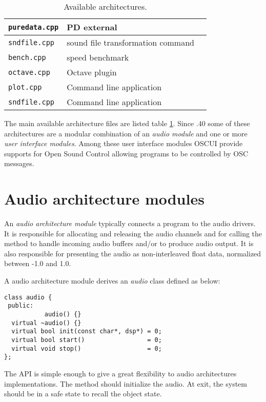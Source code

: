 \begin{table}[htp]
\begin{center}
\begin{tabular}{|l|l|l|}
\texttt{puredata.cpp} 		& PD external  \\
\hline
\texttt{sndfile.cpp} 		& sound file transformation command \\
\texttt{bench.cpp} 			& speed benchmark   \\
\texttt{octave.cpp} 		& Octave plugin   \\
\texttt{plot.cpp} 			& Command line application    \\
\texttt{sndfile.cpp} 		& Command line application    \\
\hline
\end{tabular}
\end{center}
\caption{Available architectures.}
\label{tab:availablearch}
\end{table}%


The main available architecture files are listed table \ref{tab:availablearch}. Since .40 some of these architectures are a modular combination of an \emph{audio module} and one or more \emph{user interface modules}. Among these user interface modules OSCUI provide supports for Open Sound Control allowing \faust programs to be controlled by OSC messages. 

\section{Audio architecture modules} 
An \emph{audio architecture module} typically connects a \faust program to the audio drivers.
It is responsible for allocating and releasing the audio channels and for calling the \faust {} method to handle incoming audio buffers and/or to produce audio output. It is also responsible for presenting the audio as non-interleaved float data, normalized between -1.0 and 1.0.

A \faust audio architecture module derives an \emph{audio} class defined as below:
\begin{lstlisting}[basicstyle=\ttfamily\footnotesize\color{yotxt}]
class audio {
 public:
           audio() {}
  virtual ~audio() {}
  virtual bool init(const char*, dsp*) = 0;
  virtual bool start()                 = 0;
  virtual void stop()                  = 0;
};
\end{lstlisting} 


The API is simple enough to give a great flexibility to audio architectures implementations. The  method should initialize the audio. At  exit, the system should be in a safe state to recall the  object state.

